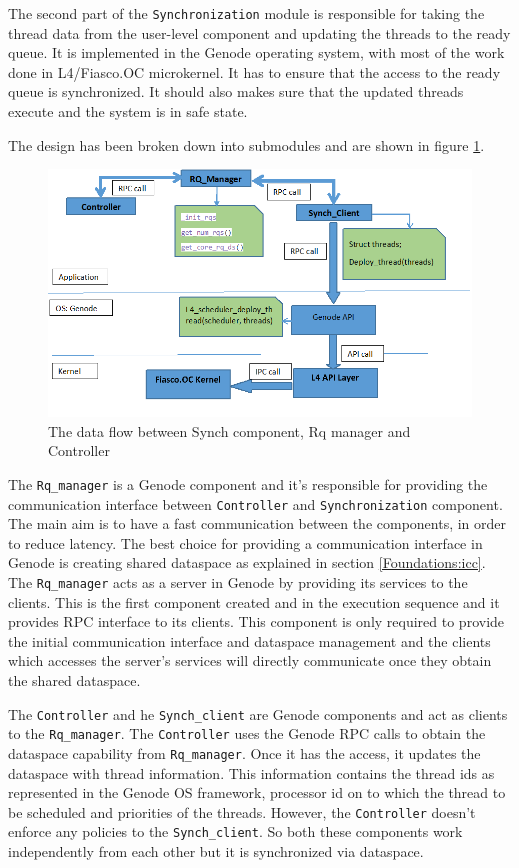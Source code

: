 The second part of the \texttt{Synchronization} module is responsible for taking the thread data from the user-level component and updating the threads to the ready queue. It is implemented in the Genode operating system, with most of the work done in L4/Fiasco.OC microkernel. It has to ensure that the access to the ready queue is synchronized. It should also makes sure that the updated threads execute and the system is in safe state.

The design has been broken down into submodules and are shown in figure \ref{fig:Design_25}.

\begin{figure}[h]
\centering
\includegraphics[width=1.0\linewidth]{figures/Design_25.png}
\caption{The data flow between Synch component, Rq manager and Controller}
\label{fig:Design_25}
\end{figure}

The \texttt{Rq\_manager} is a Genode component and it's responsible for providing the communication interface between \texttt{Controller} and \texttt{Synchronization} component.  The main aim is to have a fast communication between the components, in order to reduce latency. The best choice for providing a communication interface in Genode is creating shared dataspace as explained in section \ref{Foundations:icc}. The \texttt{Rq\_manager} acts as a server in Genode by providing its services to the clients. This is the first component created and in the execution sequence and it provides RPC interface to its clients. This component is only required to provide the initial communication interface and dataspace management and the clients which accesses the server's services will directly communicate once they obtain the shared dataspace. 

The \texttt{Controller} and he \texttt{Synch\_client} are Genode components and  act as clients to the \texttt{Rq\_manager}. The \texttt{Controller} uses the Genode RPC calls to obtain the dataspace capability from \texttt{Rq\_manager}. Once it has the access, it updates the dataspace with thread information. This information contains the thread ids as represented in the Genode OS framework, processor id on to which the thread to be scheduled and priorities of the threads. However, the \texttt{Controller} doesn't enforce any policies to the \texttt{Synch\_client}. So both these components work independently from each other but it is synchronized via dataspace.

